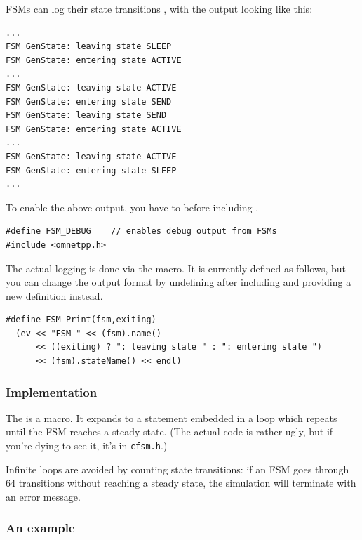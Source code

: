 FSMs can log their state transitions ,
with the output looking like this:

\begin{verbatim}
...
FSM GenState: leaving state SLEEP
FSM GenState: entering state ACTIVE
...
FSM GenState: leaving state ACTIVE
FSM GenState: entering state SEND
FSM GenState: leaving state SEND
FSM GenState: entering state ACTIVE
...
FSM GenState: leaving state ACTIVE
FSM GenState: entering state SLEEP
...
\end{verbatim}

To enable the above output, you have to 
before including .

\begin{Verbatim}[commandchars=\\\{\}]
#define FSM_DEBUG    // enables debug output from FSMs
#include <omnetpp.h>
\end{Verbatim}

The actual logging is done via the  macro.
It is currently defined as follows, but you can change the
output format by undefining  after including
 and providing a new definition instead.

\begin{verbatim}
#define FSM_Print(fsm,exiting)
  (ev << "FSM " << (fsm).name()
      << ((exiting) ? ": leaving state " : ": entering state ")
      << (fsm).stateName() << endl)
\end{verbatim}


\subsubsection{Implementation}


The  is a macro. It expands to a 
statement embedded in a  loop which repeats until the
FSM reaches a steady state. (The actual code is rather
ugly, but if you're dying to see it, it's in \texttt{cfsm.h}.)

Infinite loops are avoided by counting state transitions: if
an FSM goes through 64 transitions without reaching a steady
state, the simulation will terminate with an error message.


\subsubsection{An example}


